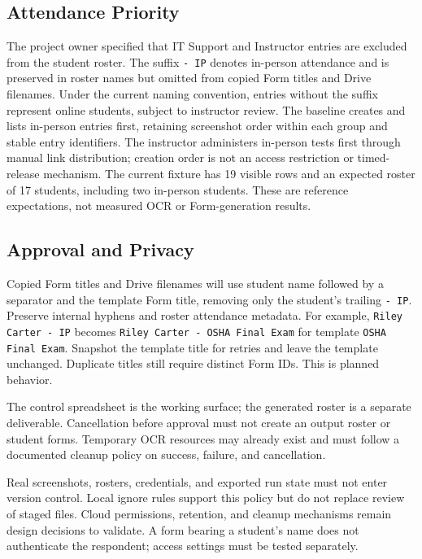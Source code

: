 \subsection{Attendance Priority}
The project owner specified that IT Support and Instructor entries are excluded
from the student roster. The suffix \texttt{- IP} denotes in-person attendance
and is preserved in roster names but omitted from copied Form titles and Drive
filenames. Under the current naming
convention, entries without the suffix represent online students, subject to
instructor review. The baseline creates and lists in-person entries first,
retaining screenshot order within each group and stable entry identifiers.
The instructor administers in-person tests first through manual link
distribution; creation order is not an access restriction or timed-release
mechanism. The current fixture has 19 visible rows and an expected roster of
17 students, including two in-person students. These are reference expectations,
not measured OCR or Form-generation results.

\subsection{Approval and Privacy}
Copied Form titles and Drive filenames will use student name followed by a
separator and the template Form title, removing only the student's trailing
\texttt{- IP}. Preserve internal hyphens and roster attendance metadata.
For example, \texttt{Riley Carter - IP} becomes
\texttt{Riley Carter - OSHA Final Exam} for template \texttt{OSHA Final Exam}.
Snapshot the template title for retries and leave the template unchanged.
Duplicate titles still require distinct Form IDs. This is planned behavior.

The control spreadsheet is the working surface; the generated roster is a
separate deliverable. Cancellation before approval must not create an output
roster or student forms. Temporary OCR resources may already exist and must
follow a documented cleanup policy on success, failure, and cancellation.

Real screenshots, rosters, credentials, and exported run state must not enter
version control. Local ignore rules support this policy but do not replace
review of staged files. Cloud permissions, retention, and cleanup mechanisms
remain design decisions to validate. A form bearing a student's name does not
authenticate the respondent; access settings must be tested separately.
